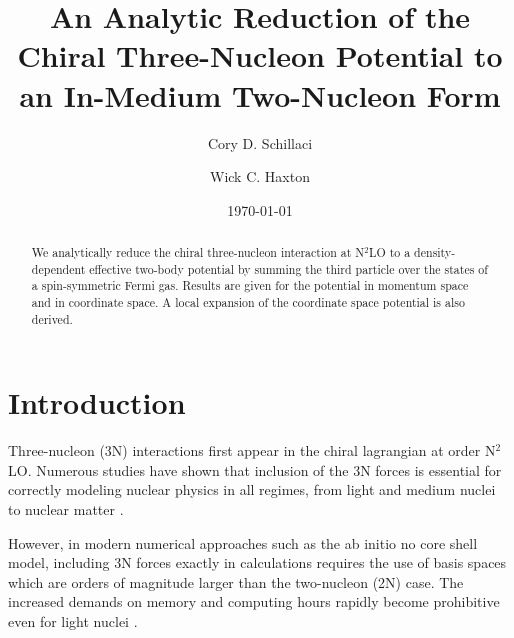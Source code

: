 \documentclass[%
 preprint,
 amsmath,amssymb,
 aps,
]{revtex4-1}
\begin{document}

\title{An Analytic Reduction of the Chiral Three-Nucleon Potential to an In-Medium Two-Nucleon Form}%

\author{Cory D. Schillaci}
\author{Wick C. Haxton}%
%

\date{\today}%

\begin{abstract}
We analytically reduce the chiral three-nucleon interaction at N$^2$LO to a density-dependent effective two-body potential by summing the third particle over the states of a spin-symmetric Fermi gas. Results are given for the potential in momentum space and in coordinate space. A local expansion of the coordinate space potential is also derived. 
\end{abstract}

\maketitle


\section{\label{sec:level1}Introduction}

Three-nucleon (3N) interactions first appear in the chiral lagrangian at order N$^2$LO. Numerous studies have shown that inclusion of the 3N forces is essential for correctly modeling nuclear physics in all regimes, from light and medium nuclei \cite{PhysRevLett.99.042501,0954-3899-39-8-085111} to nuclear matter \cite{PhysRevC.82.014314,PhysRevC.83.031301}.

However, in modern numerical approaches such as the ab initio no core shell model, including 3N forces exactly in calculations requires the use of basis spaces which are orders of magnitude larger than the two-nucleon (2N) case. The increased demands on memory and computing hours rapidly become prohibitive even for light nuclei \cite{Barrett2013131}. 
\end{document}
